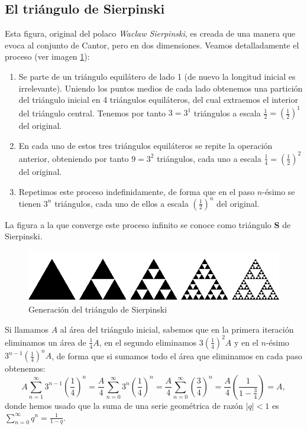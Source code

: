 \subsection{El triángulo de Sierpinski}
\label{subsection:triangulo-Sierpinski} 

Esta figura, original del polaco \textit{Waclaw Sierpinski}, es creada de una manera que evoca al conjunto de Cantor, pero en dos dimensiones. Veamos detalladamente el proceso (ver imagen \ref{fig:triangulo-Sierpinski}):

\begin{enumerate}
\item Se parte de un triángulo equilátero de lado 1 (de nuevo la longitud inicial es irrelevante). Uniendo los puntos medios de cada lado obtenemos una partición del triángulo inicial en 4 triángulos equiláteros, del cual extraemos el interior del triángulo central. Tenemos por tanto $3=3^1$ triángulos a escala $\frac 1 2 = \left(\frac 1 2\right)^1$ del original.

\item En cada uno de estos tres triángulos equiláteros se repite la operación anterior, obteniendo por tanto $9=3^2$ triángulos, cada uno a escala $\frac 1 4 = \left(\frac 1 2\right)^2$ del original.

\item Repetimos este proceso indefinidamente, de forma que en el paso $n$-ésimo se tienen $3^n$ triángulos, cada uno de ellos a escala $\left(\frac 1 2\right)^n$ del original.
\end{enumerate}

La figura a la que converge este proceso infinito se conoce como triángulo \textbf{S} de Sierpinski.

\begin{figure} [h]
\centering
\includegraphics[scale = 0.6]{img/Sierpinski-triangle.png}
\caption{Generación del triángulo de Sierpinski}
 \label{fig:triangulo-Sierpinski}
\end{figure}

Si llamamos $A$ al área del triángulo inicial, sabemos que en la primera iteración eliminamos un área de $\frac 1 4 A$, en el segundo eliminamos $3 \left(\frac 1 4\right)^2 A$ y en el $n$-ésimo $3^{n-1}\left(\frac 1 4\right)^n A$, de forma que si sumamos todo el área que eliminamos en cada paso obtenemos:
$$
A \sum_{n=1}^\infty 3^{n-1}\left(\frac 1 4\right)^n  = \frac A 4  \sum_{n=0}^\infty 3^n\left(\frac 1 4\right)^n =  \frac A 4  \sum_{n=0}^\infty \left(\frac 3 4\right)^n = \frac{A}{4} \left(\frac{1}{1-\frac{3}{4}}\right) = A,
$$
donde hemos usado que la suma de una serie geométrica de razón $|q|<1$ es $\sum_{n=0}^\infty q^n = \frac{1}{1-q}$.

